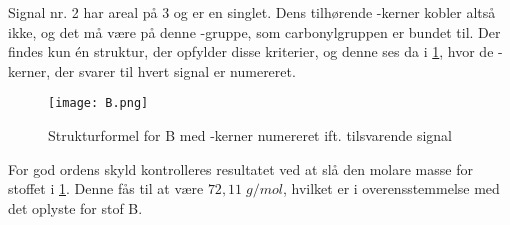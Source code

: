 \documentclass{report}
\begin{document}
Signal nr. 2 har areal på 3 og er en singlet.
Dens tilhørende -kerner  kobler altså ikke, og det må være på denne -gruppe, som carbonylgruppen  er bundet til. 
Der findes kun én struktur, der opfylder disse kriterier, og denne ses da i \cref{fig:B}, hvor de -kerner, der svarer til hvert signal er numereret.
\begin{figure}[H]
\begin{center}
  \texttt{[image: B.png]}
\end{center}
\caption{Strukturformel for B med -kerner numereret ift. tilsvarende signal}
\label{fig:B}
\end{figure}
For god ordens skyld kontrolleres resultatet ved at slå den molare masse for stoffet i \cref{fig:B}.
Denne fås til at være $72,11 \;\unit{g/mol} $, hvilket er i overensstemmelse med det oplyste for stof B.
\end{document}
